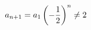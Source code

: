 \documentclass[preview]{standalone}
\begin{document}
\begin{align*}
\special{dvisvgm:raw <g id='unique000'>}a_{n+1}=a_1\left(-\frac{1}{2}\right)^n \neq 2\special{dvisvgm:raw </g>}
\end{align*}
\end{document}
